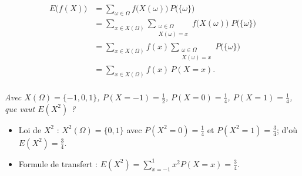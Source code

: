 \begin{prv}
	\begin{align*}
		E\big(f(X)\big) &= \sum_{\omega \in \Omega}f\big(X(\omega)\big)\,P\big(\{\omega\}\big) \\
		&= \sum_{x \in X(\Omega)} \sum_{\substack{\omega \in \Omega\\X(\omega) = x}} f\big(X(\omega)\big)\;P\big(\{\omega\}\big) \\
		&= \sum_{x \in X(\Omega)} f(x)\sum_{\substack{\omega \in \Omega\\X(\omega) = x}} P\big(\{\omega\}\big) \\
		&= \sum_{x \in X(\Omega)}f(x)\,P(X = x). \\
	\end{align*}
\end{prv}

\begin{exm}\relax
	{\it Avec $X(\Omega) = \{-1, 0, 1\}$, $P(X = -1) = \frac{1}{2}$, $P(X = 0) = \frac{1}{4}$, $P(X = 1) = \frac{1}{4}$, que vaut $E(X^2)$ ?}
	\begin{itemize}
		\item Loi de $X^2$ : $X^2(\Omega) = \{0,1\}$ avec $P(X^2 = 0) = \frac{1}{4}$ et $P(X^2 = 1) = \frac{3}{4}$; d'où $E(X^2) = \frac{3}{4}$.
		\item Formule de transfert : $E(X^2) = \sum_{x=-1}^1 x^2P(X=x) = \frac{3}{4}$.
	\end{itemize}
\end{exm}

